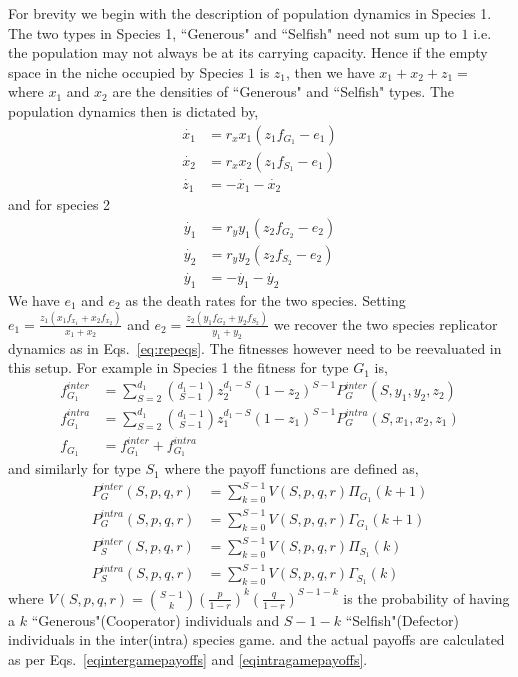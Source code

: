 \documentclass{pnastwo}
\begin{document}
\begin{article}
For brevity we begin with the description of population dynamics in Species 1.
The two types in Species 1, ``Generous" and ``Selfish" need not sum up to $1$ i.e. the population may not always be at its carrying capacity.
Hence if the empty space in the niche occupied by Species $1$ is $z_1$, then we have $x_1 + x_2 + z_1 = $ where $x_1$ and $x_2$ are the densities of ``Generous" and ``Selfish" types.
The population dynamics then is dictated by,
%
\begin{align}
	\dot{x_1} &= r_x x_1 (z_1 f_{G_1} - e_1) \\
	\dot{x_2} &= r_x x_2 (z_1 f_{S_1} - e_1) \\
	\dot{z_1} &= - \dot{x_1} - \dot{x_2}
\end{align}
%
and for species 2
\begin{align}
	\dot{y_1} &= r_y y_1 (z_2 f_{G_2} - e_2) \\
	\dot{y_2} &= r_y y_2 (z_2 f_{S_2} - e_2) \\
	\dot{y_1} &= - \dot{y_1} - \dot{y_2}
\end{align}
%
We have $e_1$ and $e_2$ as the death rates for the two species.
Setting $e_1 = \frac{z_1 (x_1 f_{x_1} + x_2 f_{x_2}) }{x_1 + x_2}$ and $e_2 = \frac{z_2 (y_1 f_{G_2} + y_2 f_{S_2}) }{y_1 + y_2}$ we recover the two species replicator dynamics as in Eqs.~\ref{eq:repeqs}.
The fitnesses however need to be reevaluated in this setup.
For example in Species 1 the fitness for type $G_1$ is,
%
\begin{align}
	f_{G_1}^{inter} &= \sum_{S=2}^{d_1} \binom{d_1 -1}{S-1} z_2 ^{d_1 -S} (1-z_2)^{S-1} P_G^{inter}(S,y_1,y_2,z_2) \\
	f_{G_1}^{intra} &= \sum_{S=2}^{d_1} \binom{d_1 -1}{S-1} z_1 ^{d_1 -S} (1-z_1)^{S-1} P_G^{intra}(S,x_1,x_2,z_1) \\
	f_{G_1} &= f_{G_1}^{inter} + f_{G_1}^{intra}
\end{align}
%
and similarly for type $S_1$ where the payoff functions are defined as,
%
\begin{align}
	P_G^{inter}(S,p,q,r) &= \sum_{k=0}^{S-1} V(S,p,q,r) \Pi_{G_1}(k+1) \\
	P_G^{intra}(S,p,q,r) &= \sum_{k=0}^{S-1} V(S,p,q,r) \Gamma_{G_1}(k+1) \\
	P_S^{inter}(S,p,q,r) &= \sum_{k=0}^{S-1} V(S,p,q,r) \Pi_{S_1}(k) \\
	P_S^{intra}(S,p,q,r) &= \sum_{k=0}^{S-1} V(S,p,q,r) \Gamma_{S_1}(k)
\end{align}
%
where $V(S,p,q,r) = \binom{S-1}{k} \left( \frac{p}{1-r}\right)^k  \left(\frac{q}{1-r}\right)^{S-1-k}$ is the probability of having a $k$ ``Generous"(Cooperator) individuals and $S-1-k$ ``Selfish"(Defector) individuals in the inter(intra) species game.
and the actual payoffs are calculated as per Eqs.~\ref{eqintergamepayoffs} and \ref{eqintragamepayoffs}.






\end{article}
\end{document}

